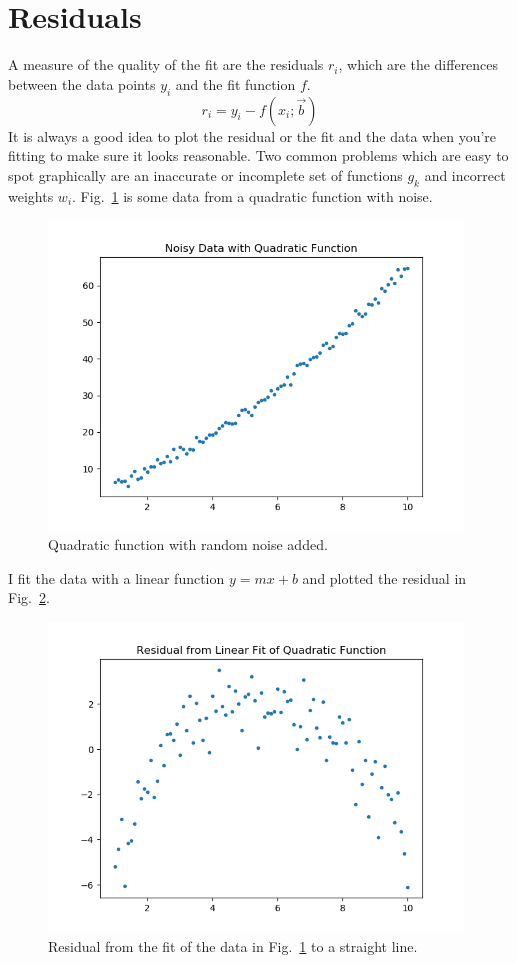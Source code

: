\documentclass{scrartcl}
\begin{document}
\section{Residuals}
A measure of the quality of the fit are the residuals $r_i$, which
are the differences between the data points $y_i$ and the
fit function $f$.
\begin{equation}
r_i = y_i - f(x_i;\vec{b})
\end{equation}
It is always a good idea to plot the residual or the fit
and the data when you're fitting
to make sure it looks reasonable. Two common problems which
are easy to spot graphically are an inaccurate or incomplete
set of functions $g_k$ and incorrect weights $w_i$.
Fig.~\ref{fig:quaddata} is some data from a quadratic function
with noise.
\begin{figure}
\begin{center}
\includegraphics[width=11cm]{quaddata}
\end{center}
\caption{\label{fig:quaddata}Quadratic function with random
noise added.}
\end{figure}
I fit the data with a linear function $y=mx+b$ and plotted the
residual in Fig.~\ref{fig:lin2quad}.
\begin{figure}
\begin{center}
\includegraphics[width=11cm]{lin2quad}
\end{center}
\caption{\label{fig:lin2quad}Residual from the fit of the
data in Fig.~\ref{fig:quaddata} to a straight line.}
\end{figure}
\end{document}
